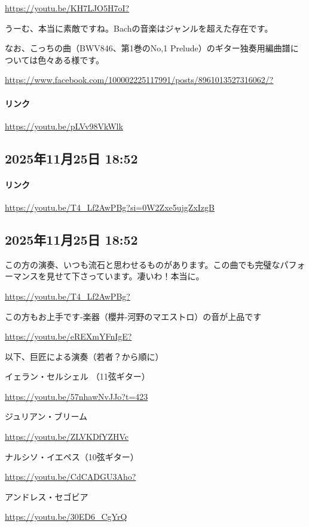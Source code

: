 \url{https://youtu.be/KH7LJO5H7oI?}

うーむ、本当に素敵ですね。Bachの音楽はジャンルを超えた存在です。

なお、こっちの曲（BWV846、第1巻のNo,1 Prelude）のギター独奏用編曲譜については色々ある様です。

\url{https://www.facebook.com/100002225117991/posts/8961013527316062/?}

\paragraph{リンク}
\url{https://youtu.be/pLVv98VkWlk}

\subsection*{2025年11月25日 18:52}

\paragraph{リンク}
\url{https://youtu.be/T4_Lf2AwPBg?si=0W2Zxe5ujgZxIzgB}

\subsection*{2025年11月25日 18:52}

この方の演奏、いつも流石と思わせるものがあります。この曲でも完璧なパフォーマンスを見せて下さっています。凄いわ！本当に。

\url{https://youtu.be/T4_Lf2AwPBg?}

この方もお上手です-楽器（櫻井-河野のマエストロ）の音が上品です

\url{https://youtu.be/eREXmYFnIgE?}

以下、巨匠による演奏（若者？から順に）

イェラン・セルシェル （11弦ギター）

\url{https://youtu.be/57nhawNvJJo?t=423}

ジュリアン・ブリーム

\url{https://youtu.be/ZLVKDfYZHVc}

ナルシソ・イエペス（10弦ギター）

\url{https://youtu.be/CdCADGU3Aho?}

アンドレス・セゴビア

\url{https://youtu.be/30ED6_CgYrQ}

